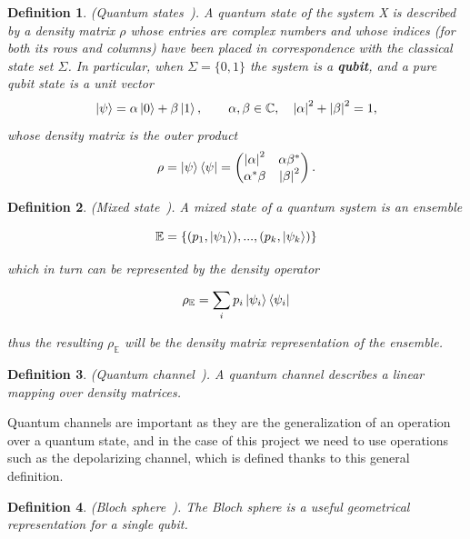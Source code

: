 \documentclass{ieeeaccess}
\newtheorem{definition}{Definition}[section]
\begin{document}
\begin{definition}
  (Quantum states~\cite{watrous_quantum_channels}). A quantum state of the system X is described by a density matrix $\rho$ whose entries are complex numbers and whose indices (for both its rows and columns) have been placed in correspondence with the classical state set $\Sigma$.
  In particular, when $\Sigma = \{0, 1\}$ the system is a \textbf{qubit}, and a pure qubit state is a unit vector
  \[
    \ket{\psi} = \alpha\ket{0} + \beta\ket{1}, \qquad \alpha, \beta \in \mathbb{C}, \quad \abs{\alpha}^2 + \abs{\beta}^2 = 1,
  \]
  whose density matrix is the outer product
  \[
    \rho = \ket{\psi}\bra{\psi} =
    \begin{pmatrix} \abs{\alpha}^2 & \alpha\beta^{*} \\ \alpha^{*}\beta & \abs{\beta}^2
    \end{pmatrix}.
  \]
  \label{def:quantum_state}
\end{definition}

\begin{definition}
  (Mixed state~\cite{zhou2017differential}). A mixed state of a quantum system is an ensemble

  \[
    \mathbb{E} = \{(p_1,\ket{\psi_1}),...,(p_k,\ket{\psi_k})\}
  \]

  which in turn can be represented by the density operator

  \[
    \rho_{\mathbb{E}} = \sum_{i}p_i\ket{\psi_i}\bra{\psi_i}
  \]

  thus the resulting $\rho_{\mathbb{E}}$ will be the density matrix representation of the ensemble.
  \label{def:mixed_state}
\end{definition}

\begin{definition}
  (Quantum channel~\cite{watrous_quantum_channels}). A quantum channel describes a linear mapping over density matrices.
  \label{def:quantum_channel}
\end{definition}

Quantum channels are important as they are the generalization of an operation over a quantum state, and in the case of this project we need to use operations such as the depolarizing channel, which is defined thanks to this general definition.

\begin{definition}
  (Bloch sphere~\cite{watrous_quantum_channels}). The Bloch sphere is a useful geometrical representation for a single qubit.
  \label{def:bloch_sphere}
\end{definition}
\end{document}
